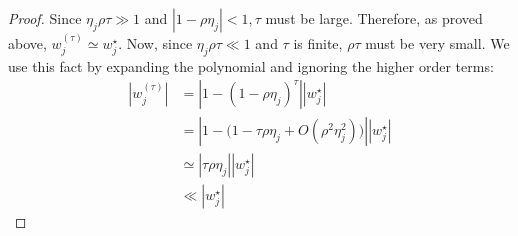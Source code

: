 \begin{proof}
    Since $\eta_j \rho \tau \gg 1$ and $|1 - \rho \eta_j| < 1, \tau$ must be large. Therefore,
    as proved above, $w_j^{(\tau)} \simeq w_j^\star$. Now, since $\eta_j \rho \tau \ll 1$ and
     $\tau$ is finite, $\rho \tau$ must be very small. We use this fact by expanding the polynomial and 
     ignoring the higher order terms:
    \begin{align*}
        |w_j^{(\tau)}| 
        &= |1 - (1 - \rho \eta_j)^\tau| |w_j^\star| \\
        &= |1 - \big(1 - \tau \rho \eta_j + O(\rho^2 \eta_j^2)\big)| |w_j^\star| \\
        &\simeq |\tau \rho \eta_j| |w_j^\star| \\
        &\ll |w_j^\star|
    \end{align*}
\end{proof}


